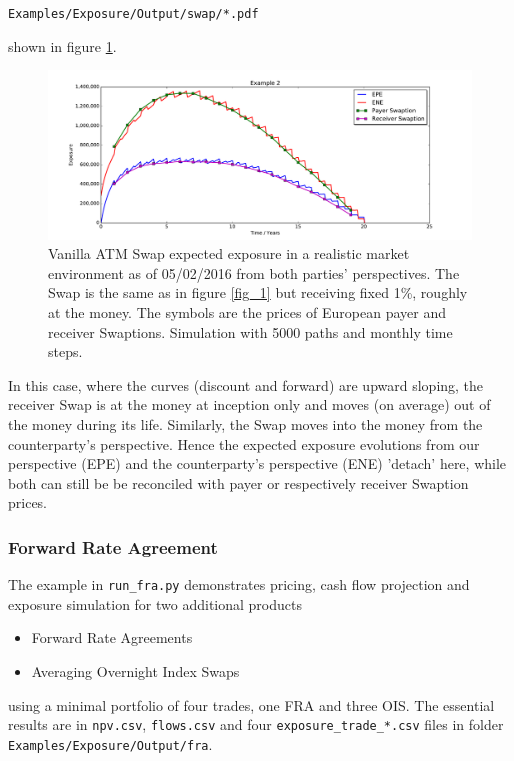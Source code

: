 \medskip
\centerline{\tt Examples/Exposure/Output/swap/*.pdf } 
\medskip

shown in figure \ref{fig_2}.
\begin{figure}[h!]
\begin{center}
\includegraphics[scale=0.45]{examples/mpl_swap_3.pdf}
\end{center}
\caption{Vanilla ATM Swap expected exposure in a realistic market environment as of 05/02/2016 from both parties'
  perspectives. The Swap is the same as in figure \ref{fig_1} but receiving fixed 1\%, roughly at the money. The symbols
  are the prices of European payer and receiver Swaptions. Simulation with 5000 paths and monthly time steps.}
\label{fig_2}
\end{figure}
In this case, where the curves (discount and forward) are upward sloping, the receiver Swap is at the money at inception
only and moves (on average) out of the money during its life. Similarly, the Swap moves into the money from the
counterparty's perspective. Hence the expected exposure evolutions from our perspective (EPE) and the counterparty's
perspective (ENE) 'detach' here, while both can still be be reconciled with payer or respectively receiver Swaption
prices.

\subsubsection{Forward Rate Agreement}\label{example:exposure_fra}

The example in {\tt run\_fra.py} demonstrates pricing, cash flow projection and exposure simulation for two additional products
\begin{itemize}
\item Forward Rate Agreements
\item Averaging Overnight Index Swaps
\end{itemize}
using a minimal portfolio of four trades, one FRA and three OIS. The essential results are in {\tt npv.csv}, {\tt flows.csv} and 
four {\tt exposure\_trade\_*.csv} files in folder {\tt Examples/Exposure/Output/fra}.

